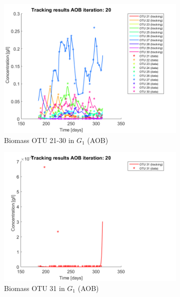 \documentclass[processes,article,submit,moreauthors,pdftex]{Definitions/mdpi}
\begin{document}
\begin{figure}[h]
\begin{subfigure}{0.45 \textwidth}
		\includegraphics[width =\textwidth]{Application//200407_iter_20_AOB_plot_3}
		\caption{Biomass OTU 21-30 in $G_1$ (AOB) }
	\end{subfigure}
	\begin{subfigure}{0.45 \textwidth}
		\includegraphics[width =\textwidth]{Application//200407_iter_20_AOB_plot_4}
		\caption{Biomass OTU 31 in $G_1$ (AOB) }
	\end{subfigure}
	\begin{subfigure}{0.45 \textwidth}

\end{subfigure}
\end{figure}
\end{document}
